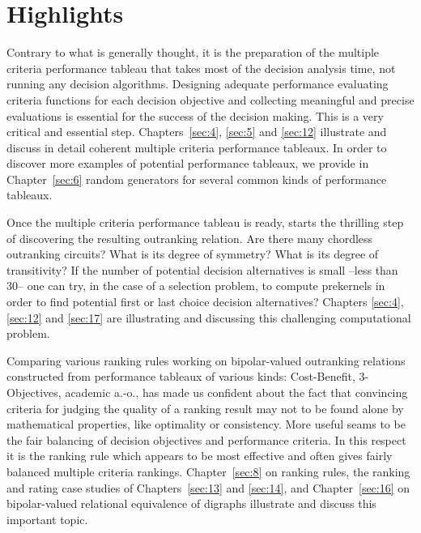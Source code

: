 {}
\section*{Highlights}
\label{sec:0.3}

Contrary to what is generally thought, it is the preparation of the multiple criteria performance tableau that takes most of the decision analysis time, not running any decision algorithms. Designing adequate performance evaluating criteria functions for each decision objective and collecting meaningful and precise evaluations is essential for the success of the decision making. This is a very critical and essential step. Chapters~\ref{sec:4}, \ref{sec:5} and \ref{sec:12} illustrate and discuss in detail coherent multiple criteria performance tableaux. In order to discover more examples of potential performance tableaux, we provide in Chapter~\ref{sec:6} random generators for several common kinds of performance tableaux. 

Once the multiple criteria performance tableau is ready, starts the thrilling step of discovering the resulting outranking relation. Are there many chordless outranking circuits? What is its degree of symmetry? What is its degree of transitivity?  If the number of potential decision alternatives is small --less than 30-- one can try, in the case of a selection problem, to compute prekernels in order to find potential first or last choice decision alternatives? Chapters \ref{sec:4}, \ref{sec:12} and \ref{sec:17} are illustrating and discussing this challenging computational problem.

Comparing various ranking rules working on bipolar-valued outranking relations constructed from performance tableaux of various kinds: Cost-Benefit, 3-Objectives, academic a.-o., has made us confident about the fact that convincing criteria for judging the quality of a ranking result may not to be found alone by mathematical properties, like \Kemeny optimality or \Condorcet consistency. More useful seams to be the fair balancing of decision objectives and performance criteria. In this respect it is the \NetFlows ranking rule which appears to be most effective and often gives fairly balanced multiple criteria rankings. Chapter~\ref{sec:8} on ranking rules, the ranking and rating case studies of Chapters~\ref{sec:13} and \ref{sec:14}, and Chapter~\ref{sec:16} on bipolar-valued relational equivalence of digraphs illustrate and discuss this important topic.

